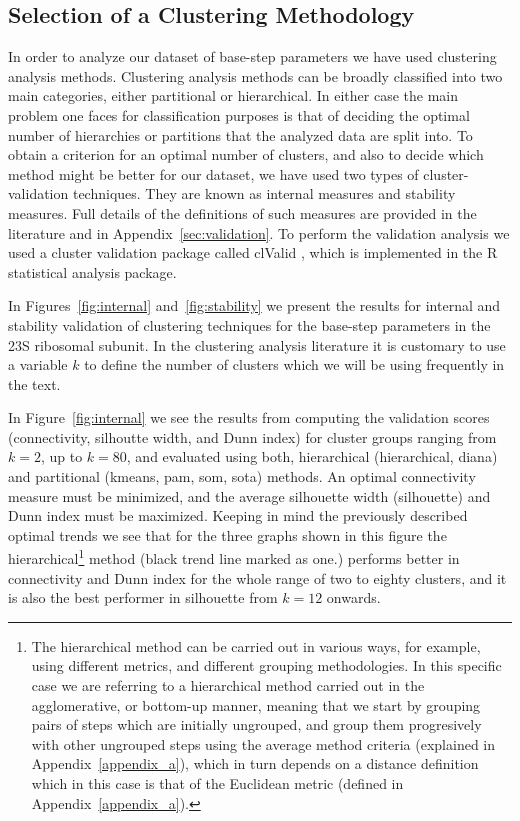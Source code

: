 \subsection{Selection of a Clustering Methodology} 
In order to  analyze our dataset of base-step  parameters we have used
clustering  analysis  methods.   Clustering  analysis methods  can  be
broadly  classified into  two main  categories, either  partitional or
hierarchical.   In  either  case   the  main  problem  one  faces  for
classification  purposes is  that of  deciding the  optimal  number of
hierarchies or partitions  that the analyzed data are  split into.  To
obtain  a criterion for  an optimal  number of  clusters, and  also to
decide which method might be better  for our dataset, we have used two
types of  cluster-validation techniques.   They are known  as internal
measures and  stability measures.  Full details of  the definitions of
such  measures   are  provided  in   the  literature  \cite{handl2005,
  brock2008}  and in  Appendix~\ref{sec:validation}.   To perform  the
validation  analysis  we  used  a cluster  validation  package  called
clValid \cite{brock2008},  which is implemented in  the R \cite{rcite}
statistical analysis package.

In  Figures~\ref{fig:internal} and~\ref{fig:stability} we  present the
results for internal and stability validation of clustering techniques
for the  base-step parameters  in the 23S  ribosomal subunit.   In the
clustering analysis literature  it is customary to use  a variable $k$
to define the number of clusters  which we will be using frequently in
the text.

In  Figure~\ref{fig:internal} we  see the  results from  computing the
validation scores (connectivity, silhoutte  width, and Dunn index) for
cluster groups ranging  from $k=2$, up to $k=80$,  and evaluated using
both, hierarchical (hierarchical, diana) and partitional (kmeans, pam,
som, sota) methods. An optimal connectivity measure must be minimized,
and the average  silhouette width (silhouette) and Dunn  index must be
maximized.  Keeping in mind the previously described optimal trends we
see  that  for   the  three  graphs  shown  in   this  figure  the
hierarchical\footnote{The  hierarchical method can  be carried  out in
  various ways,  for example,  using different metrics,  and different
  grouping methodologies.  In this specific case we are referring to a
  hierarchical method  carried out in the  agglomerative, or bottom-up
  manner, meaning that  we start by grouping pairs  of steps which are
  initially  ungrouped,   and  group  them   progresively  with  other
  ungrouped  steps using  the  average method  criteria (explained  in
  Appendix~\ref{appendix_a}),  which  in turn  depends  on a  distance
  definition  which in  this  case  is that  of  the Euclidean  metric
  (defined in  Appendix~\ref{appendix_a}).}  method (black  trend line
marked  as one.)  performs  better in connectivity and  Dunn index
for the whole range of two to eighty clusters, and it is also the best
performer in silhouette from $k=12$ onwards.

